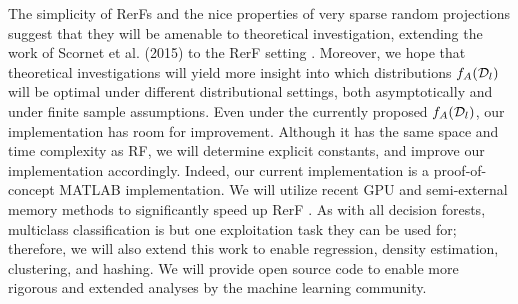 The simplicity of RerFs and the nice properties of very sparse random projections \cite{Li2006} suggest that they will be amenable to theoretical investigation, extending the work of Scornet et al. (2015) to the RerF setting \cite{Scornet2015}. Moreover, we hope that theoretical investigations will yield more insight into which distributions $f_A(\mathcal{D}_l)$ will be optimal under different distributional settings, both asymptotically and under finite sample assumptions. Even under the currently proposed $f_A(\mathcal{D}_l)$, our implementation has room for improvement. Although it has the same space and time complexity as RF, we will determine explicit constants, and improve our implementation accordingly. Indeed, our current implementation is a proof-of-concept MATLAB implementation. We will utilize recent GPU and semi-external memory methods to significantly speed up RerF \cite{zheng15flashgraph}. As with all decision forests, multiclass classification is but one exploitation task they can be used for; therefore, we will also extend this work to enable regression, density estimation, clustering, and hashing. We will provide open source code to enable more rigorous and extended analyses by the machine learning community.





